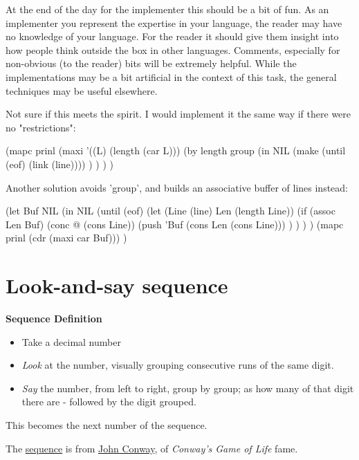 \begin{itemize}
At the end of the day for the implementer this should be a bit of fun.
As an implementer you represent the expertise in your language, the
reader may have no knowledge of your language. For the reader it should
give them insight into how people think outside the box in other
languages. Comments, especially for non-obvious (to the reader) bits
will be extremely helpful. While the implementations may be a bit
artificial in the context of this task, the general techniques may be
useful elsewhere.

\begin{wideverbatim}

Not sure if this meets the spirit. I would implement it the same way if there
were no "restrictions":

(mapc prinl
   (maxi '((L) (length (car L)))
      (by length group
         (in NIL
            (make (until (eof) (link (line)))) ) ) ) )

Another solution avoids 'group', and builds an associative buffer of lines
instead:

(let Buf NIL
   (in NIL
      (until (eof)
         (let (Line (line)  Len (length Line))
            (if (assoc Len Buf)
               (conc @ (cons Line))
               (push 'Buf (cons Len (cons Line))) ) ) ) )
   (mapc prinl (cdr (maxi car Buf))) )

\end{wideverbatim}

\pagebreak{}
\section*{Look-and-say sequence}

\textbf{Sequence Definition}

\begin{itemize}
\item
  Take a decimal number
\item
  \emph{Look} at the number, visually grouping consecutive runs of the
  same digit.
\item
  \emph{Say} the number, from left to right, group by group; as how many
  of that digit there are - followed by the digit grouped.
\end{itemize}

This becomes the next number of the sequence.

The
\href{http://en.wikipedia.org/wiki/Look\_and\_say\_sequence}{sequence}
is from \href{http://en.wikipedia.org/wiki/John\_Horton\_Conway}{John
Conway}, of \emph{Conway's Game of
Life} fame.


\end{itemize}
